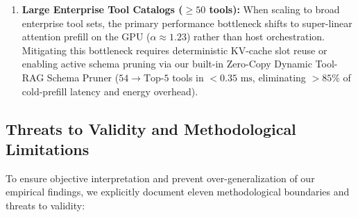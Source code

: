 \documentclass[11pt,a4paper]{article}
\begin{document}
\begin{enumerate}
    \item \textbf{Large Enterprise Tool Catalogs ($\ge 50$ tools):} When scaling to broad enterprise tool sets, the primary performance bottleneck shifts to super-linear attention prefill on the GPU ($\alpha \approx 1.23$) rather than host orchestration. Mitigating this bottleneck requires deterministic KV-cache slot reuse or enabling active schema pruning via our built-in Zero-Copy Dynamic Tool-RAG Schema Pruner ($54 \rightarrow \text{Top-}5$ tools in $<0.35\text{ ms}$, eliminating $>85\%$ of cold-prefill latency and energy overhead).
\end{enumerate}

\subsection{Threats to Validity and Methodological Limitations}
\label{sec:threats_to_validity}
To ensure objective interpretation and prevent over-generalization of our empirical findings, we explicitly document eleven methodological boundaries and threats to validity:
\end{document}
